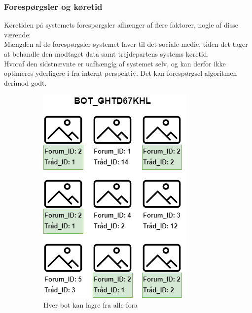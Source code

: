 \subsubsection{Forespørgsler og køretid}
Køretiden på systemets forespørgsler afhænger af flere faktorer, nogle af disse værende:\\ 
Mængden af de forespørgsler systemet laver til det sociale medie, tiden det tager at behandle den modtaget data samt trejdepartens systems køretid. \\
Hvoraf den sidstnævnte er uafhængig af systemet selv, og kan derfor ikke optimeres yderligere i fra internt perspektiv. Det kan forespørgsel algoritmen derimod godt. 

\begin{figure}[H]
    \begin{subfigure}{0.5\textwidth}
        \centering
        \includegraphics[width=0.70\linewidth]{Projectdoc/Assets/Illustrationer/bot-structure-1.png}
        \caption{Hver bot kan lagre fra alle fora}
        \label{fig:bot_unstructured}
    \end{subfigure}
    \begin{subfigure}{0.5\textwidth}
        \centering

\end{subfigure}
\end{figure}
